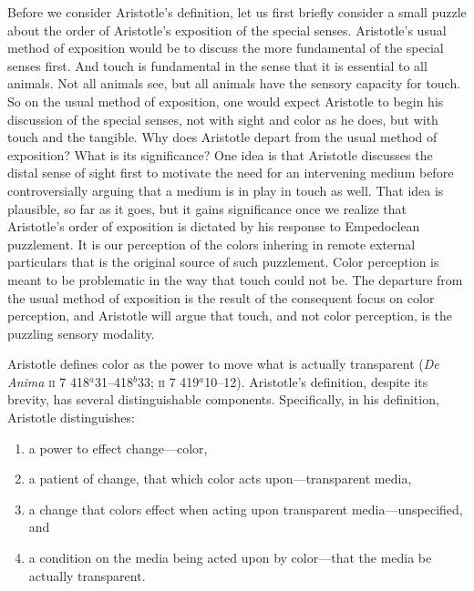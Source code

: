 Before we consider Aristotle's definition, let us first briefly consider a small puzzle about the order of Aristotle's exposition of the special senses. Aristotle's usual method of exposition would be to discuss the more fundamental of the special senses first. And touch is fundamental in the sense that it is essential to all animals. Not all animals see, but all animals have the sensory capacity for touch. So on the usual method of exposition, one would expect Aristotle to begin his discussion of the special senses, not with sight and color as he does, but with touch and the tangible. Why does Aristotle depart from the usual method of exposition? What is its significance? One idea is that Aristotle discusses the distal sense of sight first to motivate the need for an intervening medium before controversially arguing that a medium is in play in touch as well. That idea is plausible, so far as it goes, but it gains significance once we realize that Aristotle's order of exposition is dictated by his response to Empedoclean puzzlement. It is our perception of the colors inhering in remote external particulars that is the original source of such puzzlement. Color perception is meant to be problematic in the way that touch could not be. The departure from the usual method of exposition is the result of the consequent focus on color perception, and Aristotle will argue that touch, and not color perception, is the puzzling sensory modality.

Aristotle defines color as the power to move what is actually transparent (\emph{De Anima} \textsc{ii} 7 418\( ^{a} \)31--418\( ^{b} \)33; \textsc{ii} 7 419\( ^{a} \)10--12). Aristotle's definition, despite its brevity, has several distinguishable components. Specifically, in his definition, Aristotle distinguishes: 
\begin{enumerate}[(1)]
	\item a power to effect change---color,
	\item a patient of change, that which color acts upon---transparent media,
	\item a change that colors effect when acting upon transparent media---unspecified, and
	\item  a condition on the media being acted upon by color---that the media be actually transparent.
\end{enumerate}

